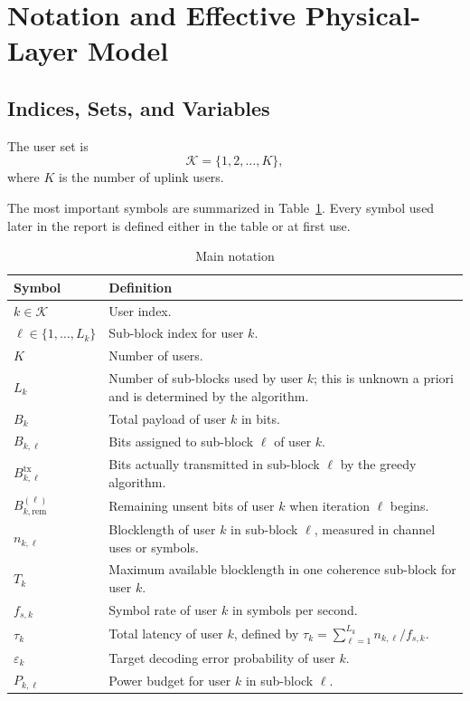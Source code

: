 \documentclass[11pt]{article}
\newcommand{\Kset}{\mathcal{K}}
\begin{document}
\section{Notation and Effective Physical-Layer Model}
\subsection{Indices, Sets, and Variables}
The user set is
\[
\Kset = \{1,2,\dots,K\},
\]
where $K$ is the number of uplink users.

The most important symbols are summarized in Table~\ref{tab:notation}. Every symbol used later in the report is defined either in the table or at first use.

\begin{table}[ht]
\centering
\caption{Main notation}
\label{tab:notation}
\renewcommand{\arraystretch}{1.15}
\begin{tabularx}{\textwidth}{>{\raggedright\arraybackslash}p{} X}
\toprule
Symbol & Definition \\
\midrule
$k \in \Kset$ & User index. \\
$\ell \in \{1,\dots,L_k\}$ & Sub-block index for user $k$. \\
$K$ & Number of users. \\
$L_k$ & Number of sub-blocks used by user $k$; this is unknown a priori and is determined by the algorithm. \\
$B_k$ & Total payload of user $k$ in bits. \\
$B_{k,\ell}$ & Bits assigned to sub-block $\ell$ of user $k$. \\
$B^{\mathrm{tx}}_{k,\ell}$ & Bits actually transmitted in sub-block $\ell$ by the greedy algorithm. \\
$B^{(\ell)}_{k,\mathrm{rem}}$ & Remaining unsent bits of user $k$ when iteration $\ell$ begins. \\
$n_{k,\ell}$ & Blocklength of user $k$ in sub-block $\ell$, measured in channel uses or symbols. \\
$T_k$ & Maximum available blocklength in one coherence sub-block for user $k$. \\
$f_{s,k}$ & Symbol rate of user $k$ in symbols per second. \\
$\tau_k$ & Total latency of user $k$, defined by $\tau_k = \sum_{\ell=1}^{L_k} n_{k,\ell}/f_{s,k}$. \\
$\varepsilon_k$ & Target decoding error probability of user $k$. \\
$P_{k,\ell}$ & Power budget for user $k$ in sub-block $\ell$. \\

\end{tabularx}
\end{table}
\end{document}
